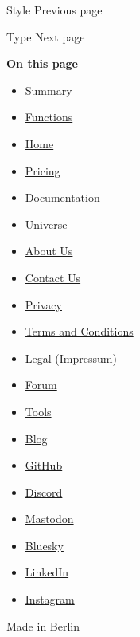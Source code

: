 { Style } { Previous page }

\href{/docs/reference/foundations/type/}{\pandocbounded{}}

{ Type } { Next page }

\textbf{On this page}

\begin{itemize}
\tightlist
\item
  \hyperref[summary]{Summary}
\item
  \hyperref[functions]{Functions}
\end{itemize}

\begin{itemize}
\tightlist
\item
  \href{/}{Home}
\item
  \href{/pricing/}{Pricing}
\item
  \href{/docs/}{Documentation}
\item
  \href{/universe/}{Universe}
\item
  \href{/about/}{About Us}
\item
  \href{/contact/}{Contact Us}
\item
  \href{/privacy/}{Privacy}
\item
  \href{https://typst.app/terms}{Terms and Conditions}
\item
  \href{/legal/}{Legal (Impressum)}
\end{itemize}

\begin{itemize}
\tightlist
\item
  \href{https://forum.typst.app}{Forum}
\item
  \href{/tools/}{Tools}
\item
  \href{/blog/}{Blog}
\item
  \href{https://github.com/typst/}{GitHub}
\item
  \href{https://discord.gg/2uDybryKPe}{Discord}
\item
  \href{https://mastodon.social/@typst}{Mastodon}
\item
  \href{https://bsky.app/profile/typst.app}{Bluesky}
\item
  \href{https://www.linkedin.com/company/typst/}{LinkedIn}
\item
  \href{https://instagram.com/typstapp/}{Instagram}
\end{itemize}

Made in Berlin
